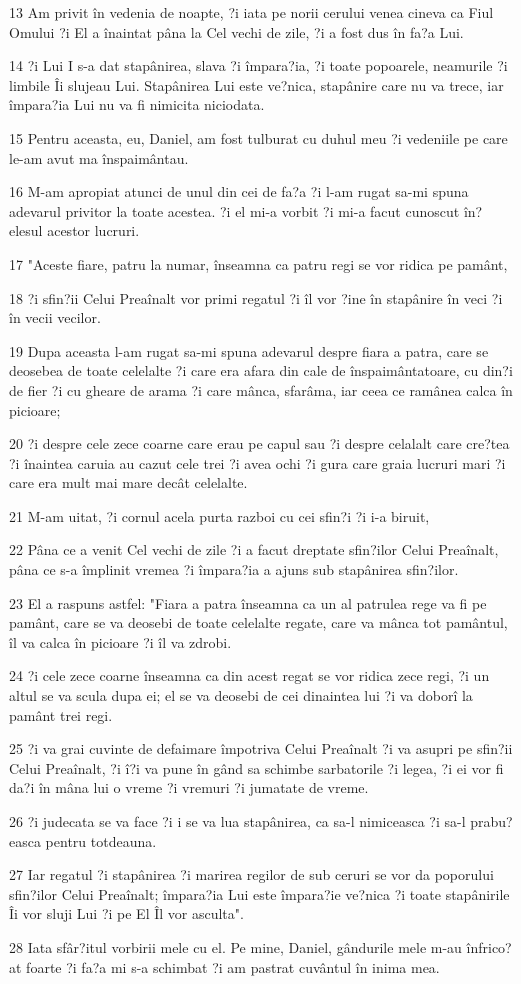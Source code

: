 \par 13 Am privit în vedenia de noapte, ?i iata pe norii cerului venea cineva ca Fiul Omului ?i El a înaintat pâna la Cel vechi de zile, ?i a fost dus în fa?a Lui.
\par 14 ?i Lui I s-a dat stapânirea, slava ?i împara?ia, ?i toate popoarele, neamurile ?i limbile Îi slujeau Lui. Stapânirea Lui este ve?nica, stapânire care nu va trece, iar împara?ia Lui nu va fi nimicita niciodata.
\par 15 Pentru aceasta, eu, Daniel, am fost tulburat cu duhul meu ?i vedeniile pe care le-am avut ma înspaimântau.
\par 16 M-am apropiat atunci de unul din cei de fa?a ?i l-am rugat sa-mi spuna adevarul privitor la toate acestea. ?i el mi-a vorbit ?i mi-a facut cunoscut în?elesul acestor lucruri.
\par 17 "Aceste fiare, patru la numar, înseamna ca patru regi se vor ridica pe pamânt,
\par 18 ?i sfin?ii Celui Preaînalt vor primi regatul ?i îl vor ?ine în stapânire în veci ?i în vecii vecilor.
\par 19 Dupa aceasta l-am rugat sa-mi spuna adevarul despre fiara a patra, care se deosebea de toate celelalte ?i care era afara din cale de înspaimântatoare, cu din?i de fier ?i cu gheare de arama ?i care mânca, sfarâma, iar ceea ce ramânea calca în picioare;
\par 20 ?i despre cele zece coarne care erau pe capul sau ?i despre celalalt care cre?tea ?i înaintea caruia au cazut cele trei ?i avea ochi ?i gura care graia lucruri mari ?i care era mult mai mare decât celelalte.
\par 21 M-am uitat, ?i cornul acela purta razboi cu cei sfin?i ?i i-a biruit,
\par 22 Pâna ce a venit Cel vechi de zile ?i a facut dreptate sfin?ilor Celui Preaînalt, pâna ce s-a împlinit vremea ?i împara?ia a ajuns sub stapânirea sfin?ilor.
\par 23 El a raspuns astfel: "Fiara a patra înseamna ca un al patrulea rege va fi pe pamânt, care se va deosebi de toate celelalte regate, care va mânca tot pamântul, îl va calca în picioare ?i îl va zdrobi.
\par 24 ?i cele zece coarne înseamna ca din acest regat se vor ridica zece regi, ?i un altul se va scula dupa ei; el se va deosebi de cei dinaintea lui ?i va doborî la pamânt trei regi.
\par 25 ?i va grai cuvinte de defaimare împotriva Celui Preaînalt ?i va asupri pe sfin?ii Celui Preaînalt, ?i î?i va pune în gând sa schimbe sarbatorile ?i legea, ?i ei vor fi da?i în mâna lui o vreme ?i vremuri ?i jumatate de vreme.
\par 26 ?i judecata se va face ?i i se va lua stapânirea, ca sa-l nimiceasca ?i sa-l prabu?easca pentru totdeauna.
\par 27 Iar regatul ?i stapânirea ?i marirea regilor de sub ceruri se vor da poporului sfin?ilor Celui Preaînalt; împara?ia Lui este împara?ie ve?nica ?i toate stapânirile Îi vor sluji Lui ?i pe El Îl vor asculta".
\par 28 Iata sfâr?itul vorbirii mele cu el. Pe mine, Daniel, gândurile mele m-au înfrico?at foarte ?i fa?a mi s-a schimbat ?i am pastrat cuvântul în inima mea.

